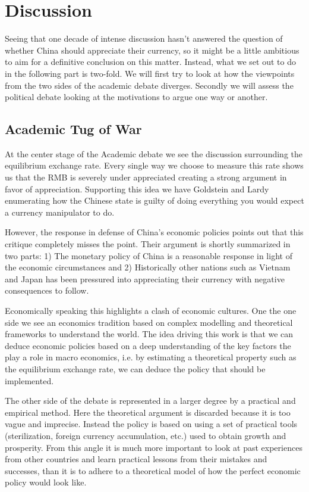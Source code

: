 \section{Discussion}

Seeing that one decade of intense discussion hasn't answered the 
question of whether China should appreciate their currency, so it might 
be a little ambitious to aim for a definitive conclusion on this matter.  
Instead, what we set out to do in the following part is two-fold. We 
will first try to look at how the viewpoints from the two sides of the 
academic debate diverges. Secondly we will assess the political debate 
looking at the motivations to argue one way or another.

\subsection{Academic Tug of War}

At the center stage of the Academic debate we see the discussion 
surrounding the equilibrium exchange rate. Every single way we choose to 
measure this rate shows us that the RMB is severely under appreciated 
creating a strong argument in favor of appreciation. Supporting this 
idea we have Goldstein and Lardy enumerating how the Chinese state is 
guilty of doing everything you would expect a currency manipulator to 
do.

However, the response in defense of China's economic policies points out 
that this critique completely misses the point. Their argument is 
shortly summarized in two parts: 1) The monetary policy of China is a 
reasonable response in light of the economic circumstances and 2) 
Historically other nations such as Vietnam and Japan has been pressured 
into appreciating their currency with negative consequences to follow.

Economically speaking this highlights a clash of economic cultures. One 
the one side we see an economics tradition based on complex modelling 
and theoretical frameworks to understand the world. The idea driving 
this work is that we can deduce economic policies based on a deep 
understanding of the key factors the play a role in macro economics, 
i.e. by estimating a theoretical property such as the equilibrium 
exchange rate, we can deduce the policy that should be implemented.  

The other side of the debate is represented in a larger degree by a 
practical and empirical method. Here the theoretical argument is 
discarded because it is too vague and imprecise. Instead the policy is 
based on using a set of practical tools (sterilization, foreign currency 
accumulation, etc.) used to obtain growth and prosperity. From this 
angle it is much more important to look at past experiences from other 
countries and learn practical lessons from their mistakes and successes, 
than it is to adhere to a theoretical model of how the perfect economic 
policy would look like.

